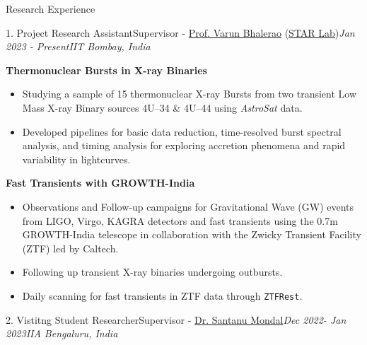 \begin{section}{Research Experience}
    \begin{subsectionnobullet1}{1. Project Research Assistant}{Supervisor - \href{https://www.phy.iitb.ac.in/en/content/varun-bhalerao}{Prof. Varun Bhalerao} (\href{https://www.star-iitb.in/}{STAR Lab})}{\textit{Jan 2023 - Present}}{\textit{IIT Bombay, India}}{}


        \textbf{Thermonuclear Bursts in X-ray Binaries}
        \begin{itemize}
            \item Studying a sample of 15 thermonuclear X-ray Bursts from two transient Low Mass X-ray Binary sources 4U--34 \& 4U--44 using \textit{AstroSat} data.
            \item Developed pipelines for basic data reduction, time-resolved burst spectral analysis, and timing analysis for exploring accretion phenomena and rapid variability in lightcurves.
        \end{itemize}
        \textbf{Fast Transients with GROWTH-India}
        \begin{itemize}
            \item Observations and Follow-up campaigns for Gravitational Wave (GW) events from LIGO, Virgo, KAGRA detectors and fast transients using the 0.7m GROWTH-India telescope in collaboration with the Zwicky Transient Facility (ZTF) led by Caltech. 
            \item Following up transient X-ray binaries undergoing outbursts.
            \item Daily scanning for fast transients in ZTF data through \texttt{ZTFRest}.
        \end{itemize}  
    \end{subsectionnobullet1}

   
    \vspace{-0.2em}
    \begin{subsectionnobullet1}{2. Vistitng Student Researcher}{Supervisor - \href{https://www.iiap.res.in/people/profile/academic/santanu-mondal/}{Dr. Santanu Mondal}}{\textit{Dec 2022- Jan 2023}}{\textit{IIA Bengaluru, India}}{}


\end{subsectionnobullet1}
\end{section}
